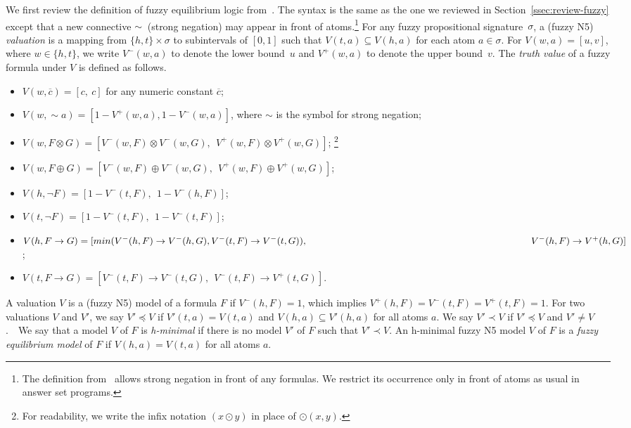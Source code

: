 \documentclass[runningheads]{llncs}
\def\sneg{\sim\!\!}
\def\rar{\rightarrow}
\def\fand{\otimes}
\def\for{\oplus}
\begin{document}
We first review the definition of fuzzy equilibrium
logic from~\cite{schockaert12fuzzy}. The syntax is the same as the one
we reviewed in Section~\ref{ssec:review-fuzzy} except that a new
connective $\sneg\ $ (strong negation) may appear in front of atoms.\footnote{The definition from~\cite{schockaert12fuzzy} allows
  strong negation in front of any formulas. We restrict its occurrence
  only in front of atoms as usual in answer set programs.} 
%
For any fuzzy propositional signature~$\sigma$, a (fuzzy N5) \emph{valuation}
is a mapping from $\{h, t\}\times\sigma$ to subintervals of $\left[0,
  1\right]$ such that  $V(t,a)\subseteq V(h,a)$ for each atom $a\in\sigma$.
%
For $V(w, a)=\left[u, v\right]$, where $w\in\{h, t\}$, 
we write $V^-(w,a)$ to denote the lower bound~$u$ and 
$V^+(w,a)$ to denote the upper bound~$v$. The {\em truth value} of
a fuzzy formula under $V$ is defined as follows.
%
\begin{itemize}
\item  $V(w, \overline{c}) = [c,\ c]$ for any numeric constant $\overline{c}$;
\item  $V(w, \sneg a) = \left[1-V^+(w, a), 1-V^-(w, a)\right]$, where
  $\sim$ is the symbol for strong negation; 
\item  $V(w, F\fand G) = 
          [V^-(w,F)\fand V^-(w,G),\ \ V^+(w,F)\fand V^+(w,G)]$; \footnote{%
For readability, we write the infix notation $(x\odot y)$ in place of $\odot (x,y)$.}

\item $V(w, F\for G) = 
          [V^-(w,F)\for V^-(w,G),\ \ V^+(w,F)\for V^+(w,G)]$;

\item  $V(h,\neg F) = [1-V^-(t, F),\ \ 1-V^-(h, F)]$;

\item  $V(t,\neg F) = [1-V^-(t, F),\ \ 1-V^-(t, F)]$;

\item  $V(h, F\rar G) = 
          [min(V^-(h,F)\rar V^-(h,G), V^-(t,F)\rar V^-(t,G)),  \\
~~\hspace{8cm} V^-(h,F)\rar V^+(h, G)]$;

\item $V(t, F\rar G) = [V^-(t,F)\rar V^-(t,G),\ \
           V^-(t,F)\rar V^+(t,G)]$.
\end{itemize}

A valuation $V$ is a (fuzzy N5) model of a formula $F$ if $V^-(h,
F)=1$, which implies $V^+(h, F)=V^-(t, F)=V^+(t, F)=1$. For two
valuations $V$ and $V'$, we say $V'\preceq V$ if $V'(t, a)=V
(t, a)$ and $V(h, a)\subseteq V'(h, a)$ for all atoms $a$.
We say $V'\prec V$ if $V'\preceq V$ and $V'\ne V$.\ \ 
We say that a model $V$ of $F$ is {\em h-minimal} if there is no model $V'$ of $F$ such that $V'\prec V$.
An h-minimal fuzzy N5 model $V$ of $F$ is a \emph{fuzzy
  equilibrium model} of $F$ if $V(h,a)=V(t,a)$ for all atoms $a$.
\end{document}
